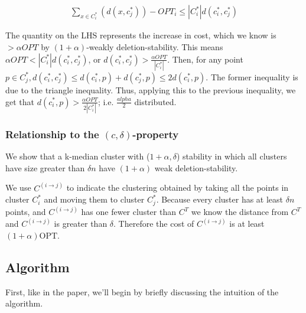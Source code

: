\documentclass[paper=a4, fontsize=11pt]{scrartcl} %
\numberwithin{equation}{section} %
\numberwithin{figure}{section} %
\numberwithin{table}{section} %
\begin{document}
\begin{align}
\sum_{x \in C^*_i} (d(x, c^*_j) )  - OPT_i \leq |C^*_i| d(c^*_i, c^*_j)
\end{align}

The quantity on the LHS represents the increase in cost, which we know is $ > \alpha OPT$ by $(1+\alpha)$-weakly deletion-stability. This means $\alpha OPT < |C^*_i| d(c^*_i, c^*_j)$, or $d(c^*_i, c^*_j) >\frac{\alpha OPT}{|C^*_i|}$.  Then, for any point $p \in C^*_j, d(c^*_i, c^*_j) \leq d(c^*_i, p) + d(c^*_j, p) \leq 2d(c^*_i, p)$. The former inequality is due to the triangle inequality.  Thus, applying this to the previous inequality, we get that $d(c^*_i, p) > \frac{\alpha OPT}{2 |C^*_i|}$; i.e. $\frac{alpha}{2}$ distributed.

\subsubsection{Relationship to the $(c, \delta)$-property}

We show that a k-median cluster with ($1+\alpha, \delta$) stability in which all clusters have size greater than $\delta n$ have $(1+\alpha)$ weak deletion-stability.

We use $C^{(i\rightarrow j)}$ to indicate the clustering obtained by taking all the points in cluster $C_i^*$ and moving them to cluster $C_j^*$. Because every cluster has at least $\delta n$ points, and $C^{(i \rightarrow j)}$ has one fewer cluster than $C^T$ we know the distance from $C^T$ and $C^{(i\rightarrow j)}$ is greater than $\delta$. Therefore the cost of $C^{(i\rightarrow j)}$ is at least $(1 + \alpha)\text{OPT}$.

\subsection{Algorithm}
First, like in the paper, we'll begin by briefly discussing the intuition of the algorithm.
\end{document}
